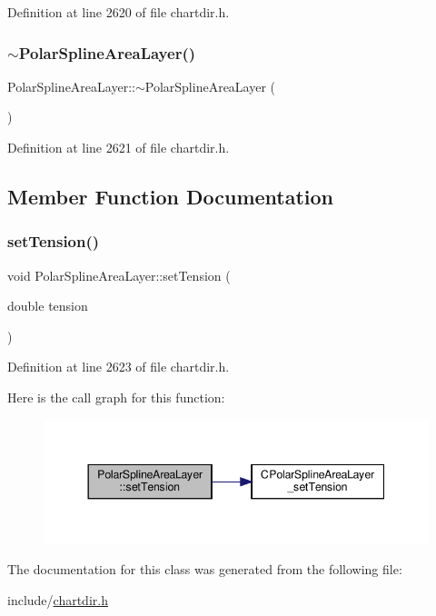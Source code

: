 Definition at line 2620 of file chartdir.\+h.

\mbox{\label{class_polar_spline_area_layer_a43d04447151e8530f32b281836898303}} 
\subsubsection{\texorpdfstring{$\sim$\+Polar\+Spline\+Area\+Layer()}{~PolarSplineAreaLayer()}}
{\footnotesize\ttfamily Polar\+Spline\+Area\+Layer\+::$\sim$\+Polar\+Spline\+Area\+Layer (\begin{DoxyParamCaption}{ }\end{DoxyParamCaption})\hspace{0.3cm}{\ttfamily [inline]}}



Definition at line 2621 of file chartdir.\+h.



\subsection{Member Function Documentation}
\mbox{\label{class_polar_spline_area_layer_a8bddc5b2dacc33ca717e61651f5f67aa}} 
\subsubsection{\texorpdfstring{set\+Tension()}{setTension()}}
{\footnotesize\ttfamily void Polar\+Spline\+Area\+Layer\+::set\+Tension (\begin{DoxyParamCaption}\item[{double}]{tension }\end{DoxyParamCaption})\hspace{0.3cm}{\ttfamily [inline]}}



Definition at line 2623 of file chartdir.\+h.

Here is the call graph for this function\+:
\nopagebreak
\begin{figure}[H]
\begin{center}
\leavevmode
\includegraphics[width=344pt]{class_polar_spline_area_layer_a8bddc5b2dacc33ca717e61651f5f67aa_cgraph}
\end{center}
\end{figure}


The documentation for this class was generated from the following file\+:\begin{DoxyCompactItemize}
\item 
include/\hyperlink{chartdir_8h}{chartdir.\+h}\end{DoxyCompactItemize}
